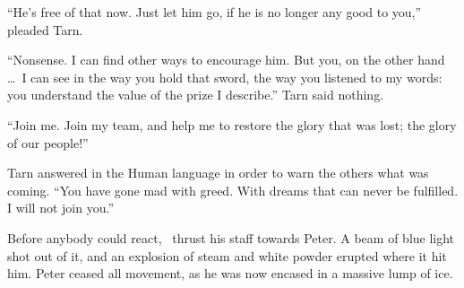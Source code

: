 ``He's free of that now.  Just let him go, if he is no longer any good to you,'' pleaded Tarn.

``Nonsense.  I can find other ways to encourage him.  But you, on the other hand \ldots\ I can see in the way you hold that sword, the way you listened to my words: you understand the value of the prize I describe.''  Tarn said nothing.

``Join me.  Join my team, and help me to restore the glory that was lost; the glory of our people!''

Tarn answered in the Human language in order to warn the others what was coming.  ``You have gone mad with greed.  With dreams that can never be fulfilled.  I will not join you.''

Before anybody could react, \mothzam\ thrust his staff towards Peter.  A beam of blue light shot out of it, and an explosion of steam and white powder erupted where it hit him.  Peter ceased all movement, as he was now encased in a massive lump of ice.

